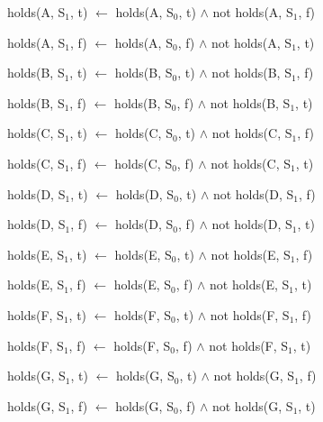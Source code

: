 \documentclass[a4paper]{article}
\begin{document}
        \begin{list}{}{Inertial Rules}
          \item
            holds(A, S$_{1}$, t) $\leftarrow$ holds(A, S$_{0}$, t) $\land$ not
            holds(A, S$_{1}$, f)
          \item
            holds(A, S$_{1}$, f) $\leftarrow$ holds(A, S$_{0}$, f) $\land$ not
            holds(A, S$_{1}$, t)
          \item
            holds(B, S$_{1}$, t) $\leftarrow$ holds(B, S$_{0}$, t) $\land$ not
            holds(B, S$_{1}$, f)
          \item
            holds(B, S$_{1}$, f) $\leftarrow$ holds(B, S$_{0}$, f) $\land$ not
            holds(B, S$_{1}$, t)
          \item
            holds(C, S$_{1}$, t) $\leftarrow$ holds(C, S$_{0}$, t) $\land$ not
            holds(C, S$_{1}$, f)
          \item
            holds(C, S$_{1}$, f) $\leftarrow$ holds(C, S$_{0}$, f) $\land$ not
            holds(C, S$_{1}$, t)
          \item
            holds(D, S$_{1}$, t) $\leftarrow$ holds(D, S$_{0}$, t) $\land$ not
            holds(D, S$_{1}$, f)
          \item
            holds(D, S$_{1}$, f) $\leftarrow$ holds(D, S$_{0}$, f) $\land$ not
            holds(D, S$_{1}$, t)
          \item
            holds(E, S$_{1}$, t) $\leftarrow$ holds(E, S$_{0}$, t) $\land$ not
            holds(E, S$_{1}$, f)
          \item
            holds(E, S$_{1}$, f) $\leftarrow$ holds(E, S$_{0}$, f) $\land$ not
            holds(E, S$_{1}$, t)
          \item
            holds(F, S$_{1}$, t) $\leftarrow$ holds(F, S$_{0}$, t) $\land$ not
            holds(F, S$_{1}$, f)
          \item
            holds(F, S$_{1}$, f) $\leftarrow$ holds(F, S$_{0}$, f) $\land$ not
            holds(F, S$_{1}$, t)
          \item
            holds(G, S$_{1}$, t) $\leftarrow$ holds(G, S$_{0}$, t) $\land$ not
            holds(G, S$_{1}$, f)
          \item
            holds(G, S$_{1}$, f) $\leftarrow$ holds(G, S$_{0}$, f) $\land$ not
            holds(G, S$_{1}$, t)
        \end{list}
\end{document}
